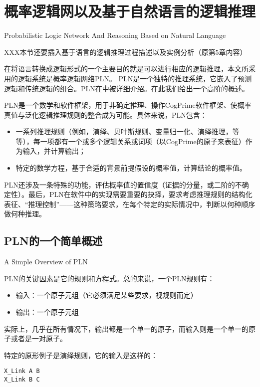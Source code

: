 \section{概率逻辑网以及基于自然语言的逻辑推理}{Probabilistic Logic Network And Reasoning Based on Natural Language}
\label{sec:pln}

XXX本节还要插入基于语言的逻辑推理过程描述以及实例分析（原第5章内容）

在将语言转换成逻辑形式的一个主要目的就是可以进行相应的逻辑推理，本文所采用的逻辑系统是概率逻辑网络PLN。 PLN是一个独特的推理系统，它嵌入了预测逻辑和传统逻辑的组合。PLN在\cite{Goertzel2008, RWR}中被详细介绍。在此我们给出一个高阶的概述。

PLN是一个数学和软件框架，用于非确定推理、操作CogPrime软件框架、使概率真值与泛化逻辑推理规则的整合成为可能。具体来说，PLN包含：

\begin{itemize}
\item 一系列推理规则（例如，演绎、贝叶斯规则、变量归一化、演绎推理，等等），每一项都有一个或多个逻辑关系或词项（以CogPrime的原子来表征）作为输入，并计算输出；
\item 特定的数学方程，基于合适的背景前提假设的概率值，计算结论的概率值。
\end{itemize}
PLN还涉及一条特殊的功能，评估概率值的置信度（证据的分量，或二阶的不确定性）。最后，PLN在软件中的实现需要重要的抉择，要求考虑推理规则的结构化表征、“推理控制”——这种策略要求，在每个特定的实际情况中，判断以何种顺序做何种推理。

\subsection{PLN的一个简单概述}{A Simple Overview of PLN}

PLN的关键因素是它的规则和方程式。总的来说，一个PLN规则有：

\begin{itemize}
\item 输入：一个原子元组（它必须满足某些要求，视规则而定）
\item 输出：一个原子元组
\end{itemize}

实际上，几乎在所有情况下，输出都是一个单一的原子，而输入则是一个单一的原子或者是一对原子。

特定的原形例子是演绎规则，它的输入是这样的：

{\tt\begin{small}\begin{lstlisting}
X_Link A B
X_Link B C
\end{lstlisting}\end{small}}

